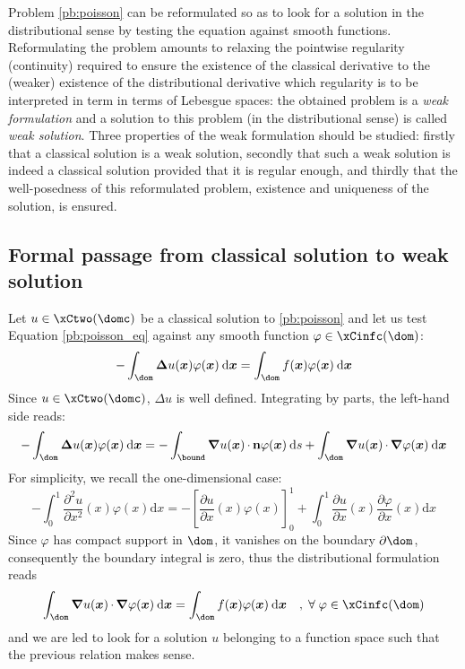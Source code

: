 Problem \eqref{pb:poisson} can be reformulated so as to look for a solution in the distributional sense by testing the equation against smooth functions.
Reformulating the problem amounts to relaxing the pointwise regularity (\ie continuity) required to ensure the existence of the classical derivative to the (weaker) existence of the distributional derivative which regularity is to be interpreted in term in terms of Lebesgue spaces: the obtained problem is a \textit{weak formulation} and a solution to this problem (\ie in the distributional sense) is called \textit{weak solution}.
Three properties of the weak formulation should be studied: firstly that a classical solution is a weak solution, secondly that such a weak solution is indeed a classical solution provided that it is regular enough, and thirdly that the well-posedness of this reformulated problem, \ie existence and uniqueness of the solution, is ensured.


\subsection{Formal passage from classical solution to weak solution}

Let $u \in \xCtwo(\domc)$ be a classical solution to \eqref{pb:poisson} and let us test Equation \eqref{pb:poisson_eq} against any smooth function $\varphi\in\xCinfc(\dom)$:
\begin{equation*}
- \int_\dom \Lap u(\xx) \varphi(\xx) \dx = \int_\dom f(\xx) \varphi(\xx)  \dx
\end{equation*}
Since $u \in \xCtwo(\domc)$, $\Delta u$ is well defined. Integrating by parts, the left-hand side reads:
\begin{equation*}
- \int_\dom \Lap u(\xx) \varphi(\xx) \dx = - \int_\bound \Grad u(\xx) \xDot \n \varphi(\xx) \ds + \int_\dom \Grad u(\xx)\xDot \Grad \varphi(\xx) \dx
\end{equation*}
For simplicity, we recall the one-dimensional case:
\begin{equation*}
- \int_0^1 \frac{\partial^2 u}{\partial x^2}(x)  \varphi(x) {\mathrm d}x = - \left[ \frac{\partial u}{\partial x}(x) \varphi(x) \right]_0^1 + \int_0^1 \frac{\partial u}{\partial x}(x) \frac{\partial \varphi}{\partial x}(x) {\mathrm d}x
\end{equation*}
Since $\varphi$ has compact support in $\dom$, it vanishes on the boundary $\partial\dom$, consequently the boundary integral is zero, thus the distributional formulation reads
\begin{equation*}
\int_\dom \Grad u(\xx)\xDot \Grad \varphi(\xx) \dx = \int_\dom f(\xx) \varphi(\xx)  \dx\quad,\;\forany\varphi\in\xCinfc(\dom)
\end{equation*}
and we are led to look for a solution $u$ belonging to a function space such that the previous relation makes sense.

